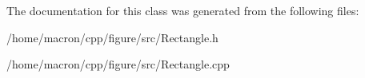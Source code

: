 The documentation for this class was generated from the following files\+:\begin{DoxyCompactItemize}
\item 
/home/macron/cpp/figure/src/Rectangle.\+h\item 
/home/macron/cpp/figure/src/Rectangle.\+cpp\end{DoxyCompactItemize}
